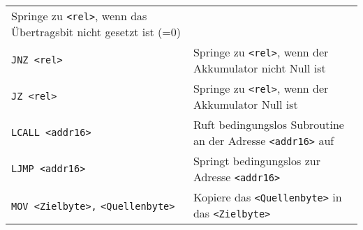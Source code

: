 \begin{longtable}[c]{@{}ll@{}}
\begin{minipage}[t]{0.69\columnwidth}\raggedright\strut
Springe zu \texttt{\textless{}rel\textgreater{}}, wenn das Übertragsbit
nicht gesetzt ist (=0)
\strut\end{minipage}\tabularnewline
\begin{minipage}[t]{0.25\columnwidth}\raggedright\strut
\texttt{JNZ\ \textless{}rel\textgreater{}}
\strut\end{minipage} &
\begin{minipage}[t]{0.69\columnwidth}\raggedright\strut
Springe zu \texttt{\textless{}rel\textgreater{}}, wenn der Akkumulator
nicht Null ist
\strut\end{minipage}\tabularnewline
\begin{minipage}[t]{0.25\columnwidth}\raggedright\strut
\texttt{JZ\ \textless{}rel\textgreater{}}
\strut\end{minipage} &
\begin{minipage}[t]{0.69\columnwidth}\raggedright\strut
Springe zu \texttt{\textless{}rel\textgreater{}}, wenn der Akkumulator
Null ist
\strut\end{minipage}\tabularnewline
\begin{minipage}[t]{0.25\columnwidth}\raggedright\strut
\texttt{LCALL\ \textless{}addr16\textgreater{}}
\strut\end{minipage} &
\begin{minipage}[t]{0.69\columnwidth}\raggedright\strut
Ruft bedingungslos Subroutine an der Adresse
\texttt{\textless{}addr16\textgreater{}} auf
\strut\end{minipage}\tabularnewline
\begin{minipage}[t]{0.25\columnwidth}\raggedright\strut
\texttt{LJMP\ \textless{}addr16\textgreater{}}
\strut\end{minipage} &
\begin{minipage}[t]{0.69\columnwidth}\raggedright\strut
Springt bedingungslos zur Adresse
\texttt{\textless{}addr16\textgreater{}}
\strut\end{minipage}\tabularnewline
\begin{minipage}[t]{0.25\columnwidth}\raggedright\strut
\texttt{MOV\ \textless{}Zielbyte\textgreater{},}
\texttt{\textless{}Quellenbyte\textgreater{}}
\strut\end{minipage} &
\begin{minipage}[t]{0.69\columnwidth}\raggedright\strut
Kopiere das \texttt{\textless{}Quellenbyte\textgreater{}} in das
\texttt{\textless{}Zielbyte\textgreater{}}
\strut\end{minipage}\tabularnewline

\end{longtable}
